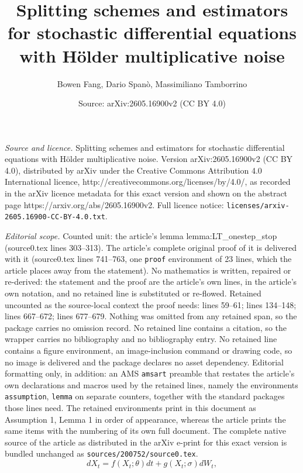 \documentclass[10pt,a4paper]{amsart}
\title{Splitting schemes and estimators for stochastic differential equations with H\"older multiplicative noise}
\author{Bowen Fang, Dario Span\`o, Massimiliano Tamborrino}
\date{Source: arXiv:2605.16900v2 (CC BY 4.0)}
\begin{document}
\maketitle

\noindent\emph{Source and licence.} Splitting schemes and estimators for stochastic differential equations with H\"older multiplicative noise. Version arXiv:2605.16900v2 (CC BY 4.0), distributed by arXiv under the Creative Commons Attribution 4.0 International licence, http://creativecommons.org/licenses/by/4.0/, as recorded in the arXiv licence metadata for this exact version and shown on the abstract page https://arxiv.org/abs/2605.16900v2. Full licence notice: \texttt{licenses/arxiv-2605.16900-CC-BY-4.0.txt}.\par\smallskip

\noindent\textit{Editorial scope.} Counted unit: the article's lemma lemma:LT\_onestep\_stop (source0.tex lines 303--313). The article's complete original proof of it is delivered with it (source0.tex lines 741--763, one \texttt{proof} environment of 23 lines, which the article places away from the statement). No mathematics is written, repaired or re-derived: the statement and the proof are the article's own lines, in the article's own notation, and no retained line is substituted or re-flowed.  Retained uncounted as the source-local context the proof needs: lines 59--61; lines 134--148; lines 667--672; lines 677--679.  Nothing was omitted from any retained span, so the package carries no omission record.  No retained line contains a citation, so the wrapper carries no bibliography and no bibliography entry.  No retained line contains a figure environment, an image-inclusion command or drawing code, so no image is delivered and the package declares no asset dependency.  Editorial formatting only, in addition: an AMS \texttt{amsart} preamble that restates the article's own declarations and macros used by the retained lines, namely the environments \texttt{assumption}, \texttt{lemma} on separate counters, together with the standard packages those lines need.  The retained environments print in this document as Assumption 1, Lemma 1 in order of appearance, whereas the article prints the same items with the numbering of its own full document.  The complete native source of the article as distributed in the arXiv e-print for this exact version is bundled unchanged as \texttt{sources/200752/source0.tex}.
\begin{equation}\label{eqn:the sde}
    dX_t=f(X_t;\theta)dt+g(X_t;\sigma)dW_t,
\end{equation}
\end{document}
